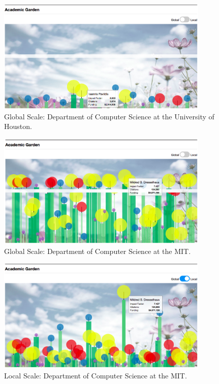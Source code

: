\begin{figure}[H]
    \centering
    \includegraphics[width=0.9\textwidth]{figures/fig-UH-Global}
    \caption{Global Scale: Department of Computer Science at the University of Houston.}
    \label{fig:uh-global}
\end{figure}



\begin{figure}[H]
    \centering
    \includegraphics[width=0.9\textwidth]{figures/fig-MIT-Global}
    \caption{Global Scale: Department of Computer Science at the MIT.}
    \label{fig:mit-global}
\end{figure}

\begin{figure}[H]
    \centering
    \includegraphics[width=0.9\textwidth]{figures/fig-MIT-Local}
    \caption{Local Scale: Department of Computer Science at the MIT.}
    \label{fig:mit-local}
\end{figure}





